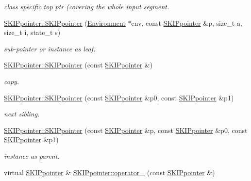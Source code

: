 \begin{DoxyCompactItemize}
\begin{DoxyCompactList}\small\item\em class specific top ptr (covering the whole input segment. \end{DoxyCompactList}\item 
\mbox{\hyperlink{group__table_ga6cd275122aebf4288f5d60c36a141116}{S\+K\+I\+Ppointer\+::\+S\+K\+I\+Ppointer}} (\mbox{\hyperlink{classEnvironment}{Environment}} $\ast$env, const \mbox{\hyperlink{classSKIPpointer}{S\+K\+I\+Ppointer}} \&p, size\+\_\+t a, size\+\_\+t i, state\+\_\+t s)
\begin{DoxyCompactList}\small\item\em sub-\/pointer or instance as leaf. \end{DoxyCompactList}\item 
\mbox{\label{group__table_ga3366b26b81c9cb040716918f7d375879}} 
\mbox{\hyperlink{group__table_ga3366b26b81c9cb040716918f7d375879}{S\+K\+I\+Ppointer\+::\+S\+K\+I\+Ppointer}} (const \mbox{\hyperlink{classSKIPpointer}{S\+K\+I\+Ppointer}} \&)
\begin{DoxyCompactList}\small\item\em copy. \end{DoxyCompactList}\item 
\mbox{\hyperlink{group__table_ga5dd0fd6fd23ca132973ec5f76a7f568d}{S\+K\+I\+Ppointer\+::\+S\+K\+I\+Ppointer}} (const \mbox{\hyperlink{classSKIPpointer}{S\+K\+I\+Ppointer}} \&p0, const \mbox{\hyperlink{classSKIPpointer}{S\+K\+I\+Ppointer}} \&p1)
\begin{DoxyCompactList}\small\item\em next sibling. \end{DoxyCompactList}\item 
\mbox{\hyperlink{group__table_ga8b87b18aa76b4021da6d3421c738b002}{S\+K\+I\+Ppointer\+::\+S\+K\+I\+Ppointer}} (const \mbox{\hyperlink{classSKIPpointer}{S\+K\+I\+Ppointer}} \&p, const \mbox{\hyperlink{classSKIPpointer}{S\+K\+I\+Ppointer}} \&p0, const \mbox{\hyperlink{classSKIPpointer}{S\+K\+I\+Ppointer}} \&p1)
\begin{DoxyCompactList}\small\item\em instance as parent. \end{DoxyCompactList}\item 
virtual \mbox{\hyperlink{classSKIPpointer}{S\+K\+I\+Ppointer}} \& \mbox{\hyperlink{group__table_ga54d7c5b3e7aa20e48ff8d15e9e0895f4}{S\+K\+I\+Ppointer\+::operator=}} (const \mbox{\hyperlink{classSKIPpointer}{S\+K\+I\+Ppointer}} \&)

\end{DoxyCompactItemize}

